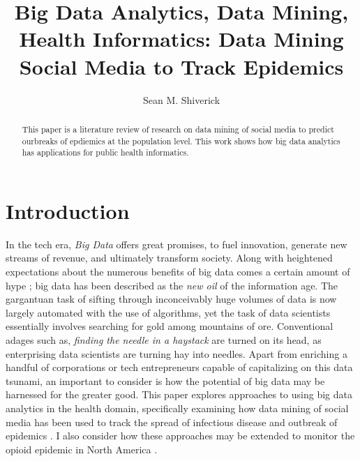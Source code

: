 \documentclass[sigconf]{acmart}
\begin{document}
\title{Big Data Analytics, Data Mining, Health Informatics: 
Data Mining Social Media to Track Epidemics}
\author{Sean M. Shiverick}


\begin{abstract}
This paper is a literature review of research on data mining of social media 
to predict ourbreaks of epdiemics at the population level. This work shows how 
big data analytics has applications for public health informatics.
\end{abstract}



\maketitle

\section{Introduction}

In the tech era, \textit{Big Data} offers great promises, to fuel innovation, 
generate new streams of revenue, and ultimately transform society. Along with 
heightened expectations about the numerous benefits of big data comes a certain 
amount of hype \cite{gupta15}; big data has been described as the \textit{new oil} 
of the information age. The gargantuan task of sifting through inconceivably huge
volumes of data is now largely automated with the use of algorithms, yet the task 
of data scientists essentially involves searching for gold among mountains of ore. 
Conventional adages such as, \textit{finding the needle in a haystack} are turned 
on its head, as enterprising data scientists are turning hay into needles. Apart 
from enriching a handful of corporations or tech entrepreneurs capable of 
capitalizing on this data tsunami, an important to consider is how the potential of 
big data may be harnessed for the greater good. This paper explores approaches to 
using big data analytics in the health domain, specifically examining how data 
mining of social media has been used to track the spread of infectious disease and 
outbreak of epidemics \cite{hay13}. I also consider how these approaches may be 
extended to monitor the opioid epidemic in North America \cite{volkow14}.
\end{document}
